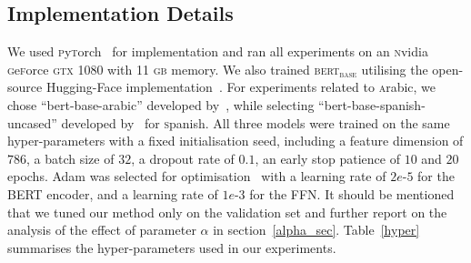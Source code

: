 \documentclass[11pt,a4paper]{article}
\begin{document}
\subsection{Implementation Details} \label{imp_det}
We used \textsc{p}y\textsc{t}orch~\cite{paszke2017automatic} for implementation and ran all experiments on an \textsc{n}vidia \textsc{g}e\textsc{f}orce \textsc{gtx} 1080 with 11 \textsc{gb} memory. We also trained \textsc{bert$_{\text{base}}$} utilising the open-source Hugging-Face implementation~\cite{Wolf2019HuggingFacesTS}. For experiments related to \textsc{a}rabic, we chose ``bert-base-arabic'' developed by~, while selecting ``bert-base-spanish-uncased'' developed by~ for \textsc{s}panish. All three models were trained on the same hyper-parameters with a fixed initialisation seed, including a feature dimension of $786$, a batch size of $32$, a dropout rate of $0.1$, an early stop patience of $10$ and $20$ epochs. Adam was selected for optimisation~\cite{kingma2014adam} with a learning rate of $2e\text{-}5$ for the BERT encoder, and a learning rate of $1e\text{-}3$ for the FFN. It should be mentioned that we tuned our method only on the validation set and further report on the analysis of the effect of parameter $\alpha$ in section~\ref{alpha_sec}. Table~\ref{hyper} summarises the hyper-parameters used in our experiments.  

\begin{table}[h]
\centering 
{}
\caption{Hyper-parameter values.~lr: refers to the Learning rate.}\label{hyper}
\end{table}
\end{document}
